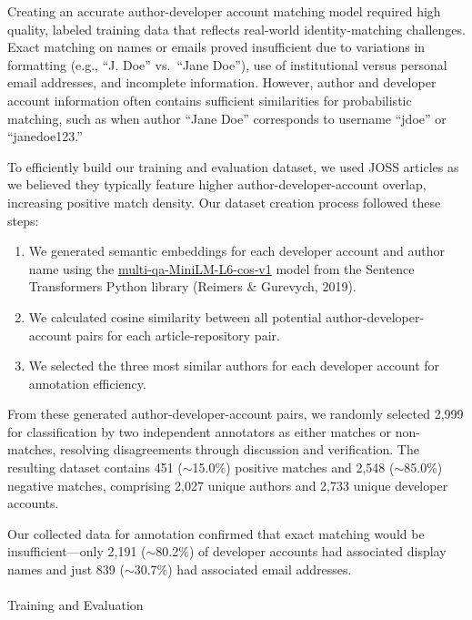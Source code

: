 \documentclass[
  letterpaper,
  DIV=11,
  numbers=noendperiod]{scrartcl}
\makeatletter
\let\oldparagraph\paragraph
\renewcommand{\paragraph}{
    \@ifstar
      \xxxParagraphStar
      \xxxParagraphNoStar
  }
\newcommand{\xxxParagraphStar}[1]{\oldparagraph*{#1}\mbox{}}
\newcommand{\xxxParagraphNoStar}[1]{\oldparagraph{#1}\mbox{}}
\providecommand{\tightlist}{%
  \setlength{\itemsep}{0pt}\setlength{\parskip}{0pt}}
\makeatother
\begin{document}
Creating an accurate author-developer account matching model required
high quality, labeled training data that reflects real-world
identity-matching challenges. Exact matching on names or emails proved
insufficient due to variations in formatting (e.g., ``J. Doe''
vs.~``Jane Doe''), use of institutional versus personal email addresses,
and incomplete information. However, author and developer account
information often contains sufficient similarities for probabilistic
matching, such as when author ``Jane Doe'' corresponds to username
``jdoe'' or ``janedoe123.''

To efficiently build our training and evaluation dataset, we used JOSS
articles as we believed they typically feature higher
author-developer-account overlap, increasing positive match density. Our
dataset creation process followed these steps:

\begin{enumerate}
\def\labelenumi{\arabic{enumi}.}
\tightlist
\item
  We generated semantic embeddings for each developer account and author
  name using the
  \href{https://huggingface.co/sentence-transformers/multi-qa-MiniLM-L6-cos-v1}{multi-qa-MiniLM-L6-cos-v1}
  model from the Sentence Transformers Python library (Reimers \&
  Gurevych, 2019).
\item
  We calculated cosine similarity between all potential
  author-developer-account pairs for each article-repository pair.
\item
  We selected the three most similar authors for each developer account
  for annotation efficiency.
\end{enumerate}

From these generated author-developer-account pairs, we randomly
selected 2,999 for classification by two independent annotators as
either matches or non-matches, resolving disagreements through
discussion and verification. The resulting dataset contains 451
($\sim$15.0\%) positive matches and 2,548
($\sim$85.0\%) negative matches, comprising 2,027 unique
authors and 2,733 unique developer accounts.

Our collected data for annotation confirmed that exact matching would be
insufficient---only 2,191 ($\sim$80.2\%) of developer accounts
had associated display names and just 839 ($\sim$30.7\%) had
associated email addresses.

\paragraph{Training and
Evaluation}\label{sec-appendix-model-training-eval}
\end{document}
